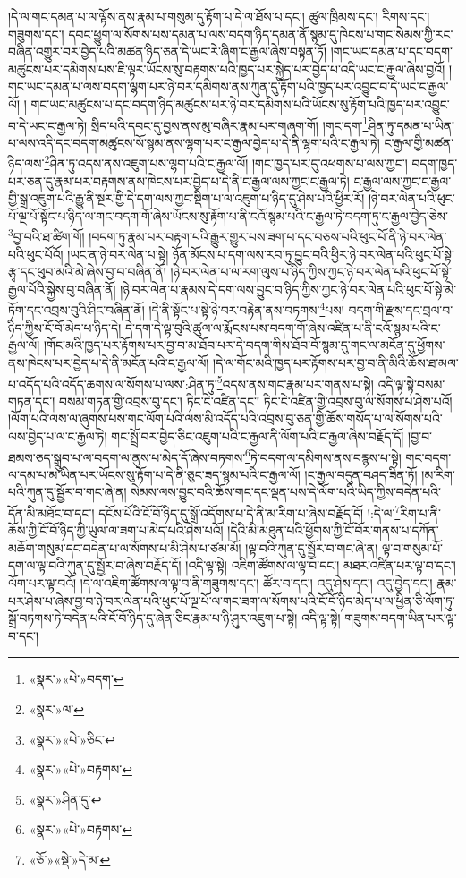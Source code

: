 །དེ་ལ་གང་དམན་པ་ལ་ལྟོས་ནས་རྣམ་པ་གསུམ་དུ་རྟོག་པ་དེ་ལ་ཐོས་པ་དང་། ཚུལ་ཁྲིམས་དང་། རིགས་དང་། གཟུགས་དང་། དབང་ཕྱུག་ལ་སོགས་པས་དམན་པ་ལས་བདག་ཉིད་དམན་ནོ་སྙམ་དུ་ཁེངས་པ་གང་སེམས་ཀྱི་རང་བཞིན་འགྱུར་བར་བྱེད་པའི་མཚན་ཉིད་ཅན་དེ་ཡང་རེ་ཞིག་ང་རྒྱལ་ཞེས་བསྟན་ཏོ། །གང་ཡང་དམན་པ་དང་བདག་མཚུངས་པར་དམིགས་པས་ཇི་ལྟར་ཡོངས་སུ་བརྟགས་པའི་ཁྱད་པར་སྐྱེད་པར་བྱེད་པ་འདི་ཡང་ང་རྒྱལ་ཞེས་བྱའོ། །གང་ཡང་དམན་པ་ལས་བདག་ལྷག་པར་ཉེ་བར་དམིགས་ནས་ཀུན་དུ་རྟོག་པའི་ཁྱད་པར་འབྱུང་བ་དེ་ཡང་ང་རྒྱལ་ལོ། །
གང་ཡང་མཚུངས་པ་དང་བདག་ཉིད་མཚུངས་པར་ཉེ་བར་དམིགས་པའི་ཡོངས་སུ་རྟོག་པའི་ཁྱད་པར་འབྱུང་བ་དེ་ཡང་ང་རྒྱལ་ཏེ། སྲིད་པའི་དབང་དུ་བྱས་ནས་མུ་བཞིར་རྣམ་པར་གཞག་གོ། །གང་དག་\footnote{«སྣར་»«པེ་»བདག་}ཤིན་ཏུ་དམན་པ་ཡིན་པ་ལས་འདི་དང་བདག་མཚུངས་སོ་སྙམ་ནས་ལྷག་པར་ང་རྒྱལ་བྱེད་པ་དེ་ནི་ལྷག་པའི་ང་རྒྱལ་ཏེ། ང་རྒྱལ་གྱི་མཚན་ཉིད་ལས་\footnote{«སྣར་»ལ་}ཤིན་ཏུ་འདས་ནས་འཇུག་པས་ལྷག་པའི་ང་རྒྱལ་ལོ། །གང་ཁྱད་པར་དུ་འཕགས་པ་ལས་ཀྱང་། བདག་ཁྱད་པར་ཅན་དུ་རྣམ་པར་བརྟགས་ནས་ཁེངས་པར་བྱེད་པ་དེ་ནི་ང་རྒྱལ་ལས་ཀྱང་ང་རྒྱལ་ཏེ། ང་རྒྱལ་ལས་ཀྱང་ང་རྒྱལ་གྱི་སྒྲ་འཇུག་པའི་རྒྱུ་ནི་སྔར་གྱི་དེ་དག་ལས་ཀྱང་སྡིག་པ་ལ་འཇུག་པ་ཉིད་དུ་ཤེས་པའི་ཕྱིར་རོ། །ཉེ་བར་ལེན་པའི་ཕུང་པོ་ལྔ་པོ་སྟོང་པ་ཉིད་ལ་གང་བདག་གོ་ཞེས་ཡོངས་སུ་རྟོག་པ་ནི་ངའོ་སྙམ་པའི་ང་རྒྱལ་ཏེ་བདག་ཏུ་ང་རྒྱལ་བྱེད་ཅེས་\footnote{«སྣར་»«པེ་»ཅིང་}བྱ་བའི་ཐ་ཚིག་གོ། །བདག་ཏུ་རྣམ་པར་བརྟག་པའི་རྒྱུར་གྱུར་པས་ཟག་པ་དང་བཅས་པའི་ཕུང་པོ་ནི་ཉེ་བར་ལེན་པའི་ཕུང་པོའོ། །ཡང་ན་ཉེ་བར་ལེན་པ་སྟེ། ཉོན་མོངས་པ་དག་ལས་རབ་ཏུ་བྱུང་བའི་ཕྱིར་ཉེ་བར་ལེན་པའི་ཕུང་པོ་སྟེ་རྩྭ་དང་ཕུབ་མའི་མེ་ཞེས་བྱ་བ་བཞིན་ནོ། །ཉེ་བར་ལེན་པ་ལ་རག་ལུས་པ་ཉིད་ཀྱིས་ཀྱང་ཉེ་བར་ལེན་པའི་ཕུང་པོ་སྟེ་རྒྱལ་པོའི་སྐྱེས་བུ་བཞིན་ནོ། །ཉེ་བར་ལེན་པ་རྣམས་དེ་དག་ལས་བྱུང་བ་ཉིད་ཀྱིས་ཀྱང་ཉེ་བར་ལེན་པའི་ཕུང་པོ་སྟེ་མེ་ཏོག་དང་འབྲས་བུའི་ཤིང་བཞིན་ནོ། །དེ་ནི་སྟོང་པ་སྟེ་ཉེ་བར་བརྟེན་ནས་བཏགས་\footnote{«སྣར་»«པེ་»བརྟགས་}པས། བདག་གི་རྫས་དང་བྲལ་བ་ཉིད་ཀྱིས་ངོ་བོ་མེད་པ་ཉིད་དེ། དེ་དག་དེ་ལྟ་བུའི་ཚུལ་ལ་རྨོངས་པས་བདག་གོ་ཞེས་འཛིན་པ་ནི་ངའོ་སྙམ་པའི་ང་རྒྱལ་ལོ། །གོང་མའི་ཁྱད་པར་རྟོགས་པར་བྱ་བ་མ་ཐོབ་པར་དེ་བདག་གིས་ཐོབ་བོ་སྙམ་དུ་གང་ལ་མངོན་དུ་ཕྱོགས་ནས་ཁེངས་པར་བྱེད་པ་དེ་ནི་མངོན་པའི་ང་རྒྱལ་ལོ། །དེ་ལ་གོང་མའི་ཁྱད་པར་རྟོགས་པར་བྱ་བ་ནི་མིའི་ཆོས་ཐ་མལ་པ་འདོད་པའི་འདོད་ཆགས་ལ་སོགས་པ་ལས་:ཤིན་ཏུ་\footnote{«སྣར་»ཤིན་དུ་}འདས་ནས་གང་རྣམ་པར་གནས་པ་སྟེ། འདི་ལྟ་སྟེ་བསམ་གཏན་དང་། བསམ་གཏན་གྱི་འབྲས་བུ་དང་། ཏིང་ངེ་འཛིན་དང་། ཏིང་ངེ་འཛིན་གྱི་འབྲས་བུ་ལ་སོགས་པ་ཤེས་པའོ། །ལོག་པའི་ལས་ལ་ཞུགས་པས་གང་ལོག་པའི་ལས་མི་འདོད་པའི་འབྲས་བུ་ཅན་གྱི་ཆོས་གསོད་པ་ལ་སོགས་པའི་ལས་བྱེད་པ་ལ་ང་རྒྱལ་ཏེ། གང་སྤྲོ་བར་བྱེད་ཅིང་འཇུག་པའི་ང་རྒྱལ་ནི་ལོག་པའི་ང་རྒྱལ་ཞེས་བརྗོད་དོ། །བྱ་བ་ཐམས་ཅད་སྒྲུབ་པ་ལ་བདག་ལ་ནུས་པ་མེད་དོ་ཞེས་བཏགས་\footnote{«སྣར་»«པེ་»བརྟགས་}ཏེ་བདག་ལ་དམིགས་ནས་བརྙས་པ་སྟེ། གང་བདག་ལ་དམ་པ་མ་ཡིན་པར་ཡོངས་སུ་རྟོག་པ་དེ་ནི་ཅུང་ཟད་སྙམ་པའི་ང་རྒྱལ་ལོ། །ང་རྒྱལ་བདུན་བཤད་ཟིན་ཏོ། །མ་རིག་པའི་ཀུན་དུ་སྦྱོར་བ་གང་ཞེ་ན། སེམས་ལས་བྱུང་བའི་ཆོས་གང་དང་ལྡན་པས་དེ་ལོག་པའི་ཡིད་ཀྱིས་བདེན་པའི་དོན་མི་མཐོང་བ་དང་། དངོས་པོའི་ངོ་བོ་ཉིད་དུ་སྒྲོ་འདོགས་པ་དེ་ནི་མ་རིག་པ་ཞེས་བརྗོད་དོ། །:དེ་ལ་\footnote{«ཅོ་»«སྡེ་»དེ་མ་}རིག་པ་ནི་ཆོས་ཀྱི་ངོ་བོ་ཉིད་ཀྱི་ཡུལ་ལ་ཟག་པ་མེད་པའི་ཤེས་པའོ། །དེའི་མི་མཐུན་པའི་ཕྱོགས་ཀྱི་ངོ་བོར་གནས་པ་དཀོན་མཆོག་གསུམ་དང་བདེན་པ་ལ་སོགས་པ་མི་ཤེས་པ་ཙམ་མོ། །ལྟ་བའི་ཀུན་དུ་སྦྱོར་བ་གང་ཞེ་ན། ལྟ་བ་གསུམ་པོ་དག་ལ་ལྟ་བའི་ཀུན་དུ་སྦྱོར་བ་ཞེས་བརྗོད་དོ། །འདི་ལྟ་སྟེ། འཇིག་ཚོགས་ལ་ལྟ་བ་དང་། མཐར་འཛིན་པར་ལྟ་བ་དང་། ལོག་པར་ལྟ་བའོ། །དེ་ལ་འཇིག་ཚོགས་ལ་ལྟ་བ་ནི་གཟུགས་དང་། ཚོར་བ་དང་། འདུ་ཤེས་དང་། འདུ་བྱེད་དང་། རྣམ་པར་ཤེས་པ་ཞེས་བྱ་བ་ཉེ་བར་ལེན་པའི་ཕུང་པོ་ལྔ་པོ་ལ་གང་ཟག་ལ་སོགས་པའི་ངོ་བོ་ཉིད་མེད་པ་ལ་ཕྱིན་ཅི་ལོག་ཏུ་སྒྲོ་བཏགས་ཏེ་བདེན་པའི་ངོ་བོ་ཉིད་དུ་ཞེན་ཅིང་རྣམ་པ་ཉི་ཤུར་འཇུག་པ་སྟེ། འདི་ལྟ་སྟེ། གཟུགས་བདག་ཡིན་པར་ལྟ་བ་དང་། 